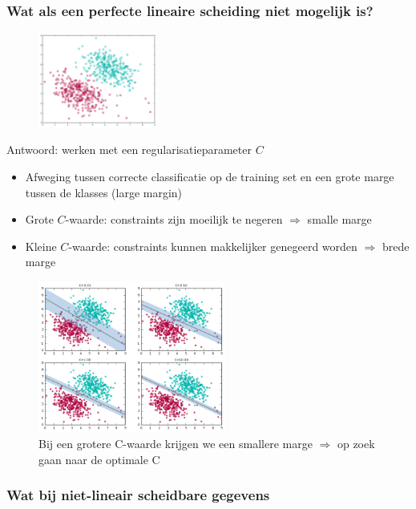 \documentclass{article}
\begin{document}
\subsubsection{Wat als een perfecte lineaire scheiding niet mogelijk is?}

\begin{figure}[H]
    \centering
    \includegraphics[width=0.35\textwidth]{svm-perfect-onmogelijk.png}
    \caption{}
\end{figure}

Antwoord: werken met een regularisatieparameter $C$

\begin{itemize}
    \item Afweging tussen correcte classificatie op de training set en een grote marge tussen de klasses (large margin)
    \item Grote $C$-waarde: constraints zijn moeilijk te negeren $\Rightarrow$ smalle marge
    \item Kleine $C$-waarde: constraints kunnen makkelijker genegeerd worden $\Rightarrow$ brede marge
\end{itemize}

\begin{figure}[H]
    \centering
    \includegraphics[width=0.55\textwidth]{svm-regularisatie.png}
    \caption{Bij een grotere C-waarde krijgen we een smallere marge $\Rightarrow$ op zoek gaan naar de optimale C}
\end{figure}

\subsubsection{Wat bij niet-lineair scheidbare gegevens}
\end{document}
